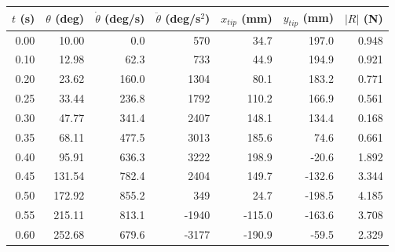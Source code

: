 \begin{tabular}{rrrrrrr}
\toprule
$t$ (s) & $\theta$ (deg) & $\dot\theta$ (deg/s) & $\ddot\theta$ (deg/s$^2$) & $x_{tip}$ (mm) & $y_{tip}$ (mm) & $|R|$ (N)\\
\midrule
0.00 & 10.00 & 0.0 & 570 & 34.7 & 197.0 & 0.948 \\
0.10 & 12.98 & 62.3 & 733 & 44.9 & 194.9 & 0.921 \\
0.20 & 23.62 & 160.0 & 1304 & 80.1 & 183.2 & 0.771 \\
0.25 & 33.44 & 236.8 & 1792 & 110.2 & 166.9 & 0.561 \\
0.30 & 47.77 & 341.4 & 2407 & 148.1 & 134.4 & 0.168 \\
0.35 & 68.11 & 477.5 & 3013 & 185.6 & 74.6 & 0.661 \\
0.40 & 95.91 & 636.3 & 3222 & 198.9 & -20.6 & 1.892 \\
0.45 & 131.54 & 782.4 & 2404 & 149.7 & -132.6 & 3.344 \\
0.50 & 172.92 & 855.2 & 349 & 24.7 & -198.5 & 4.185 \\
0.55 & 215.11 & 813.1 & -1940 & -115.0 & -163.6 & 3.708 \\
0.60 & 252.68 & 679.6 & -3177 & -190.9 & -59.5 & 2.329 \\
\bottomrule
\end{tabular}
